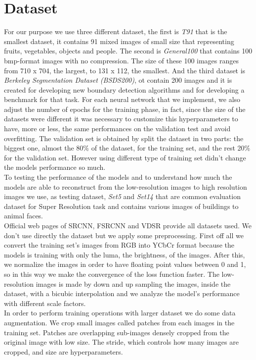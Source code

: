 \documentclass[10pt,twocolumn,letterpaper]{article}
\begin{document}
\section{Dataset}
For our purpose we use three different dataset, the first is \textit{T91} that is the smallest dataset, it contains 91 mixed images of small size that representing fruits, vegetables, objects and people. The second is \textit{General100} that contains 100 bmp-format images with no compression. The size of these 100 images ranges from 710 x 704, the largest, to 131 x 112, the smallest. And the third dataset is \textit{Berkeley Segmentation Dataset (BSDS200)}, ot contain 200 images and it is created for developing new boundary detection algorithms and for developing a benchmark for that task. For each neural network that we implement, we also adjust the number of epochs for the training phase, in fact, since the size of the datasets were different it was necessary to customize this hyperparameters to have, more or less, the same performances on the validation test and avoid overfitting. The validation set is obtained by split the dataset in two parts: the biggest one, almost the 80\% of the dataset, for the training set, and the rest 20\% for the validation set. However using different type of training set didn't change the models performance so much.\\
To testing the performance of the models and to understand how much the models are able to reconstruct from the low-resolution images to high resolution images we use, as testing dataset, \textit{Set5} and \textit{Set14} that are common evaluation dataset  for Super Resolution task and contains various images of buildings to animal faces.\\
Official web pages of SRCNN, FSRCNN and VDSR provide all datasets used.
We don’t use directly the dataset but we apply some preprocessing. First off all we convert the training set’s images from RGB into YCbCr format because the models is training with only the luma, the brightness, of the images. After this, we normalize the images in order to have floating point values between 0 and 1, so in this way we make the convergence of the loss function faster. The low-resolution images is made by down and up sampling the images, inside the dataset, with a bicubic interpolation and we analyze the model’s performance with different scale factors.\\
In order to perform training operations with larger dataset we do some data augmentation. 
We crop small images called patches from each images in the training set. Patches are overlapping sub-images densely cropped from the original image with low size. The stride, which controls how many images are cropped, and size are hyperparameters.\\
\end{document}
